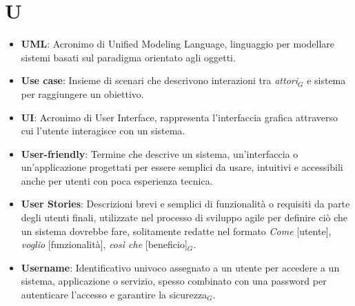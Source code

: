 \section{U}
\begin{itemize}
    \item \textbf{UML}: Acronimo di Unified Modeling Language, linguaggio per modellare sistemi basati sul paradigma orientato agli oggetti.
    \item \textbf{Use case}: Insieme di scenari che descrivono interazioni tra \textit{attori}$_G$ e sistema per raggiungere un obiettivo.
    \item \textbf{UI}: Acronimo di User Interface, rappresenta l'interfaccia grafica attraverso cui l'utente interagisce con un sistema.
    \item \textbf{User-friendly}: Termine che descrive un sistema, un'interfaccia o un'applicazione progettati per essere semplici da usare, intuitivi e accessibili anche per utenti con poca esperienza tecnica.
    \item \textbf{User Stories}: Descrizioni brevi e semplici di funzionalità o requisiti da parte degli utenti finali, utilizzate nel processo di sviluppo agile per definire ciò che un sistema dovrebbe fare, solitamente redatte nel formato \textit{Come} [utente], \textit{voglio} [funzionalità], \textit{così che} [beneficio]$_G$.
    \item \textbf{Username}: Identificativo univoco assegnato a un utente per accedere a un sistema, applicazione o servizio, spesso combinato con una password per autenticare l'accesso e garantire la sicurezza$_G$.

\end{itemize}

